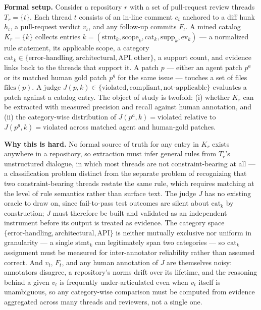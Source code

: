 \documentclass[11pt]{article}
\begin{document}
\noindent\textbf{Formal setup.} Consider a repository $r$ with a set of pull-request review threads $T_r = \{t\}$. Each thread $t$ consists of an in-line comment $c_t$ anchored to a diff hunk $h_t$, a pull-request verdict $v_t$, and any follow-up commits $F_t$. A mined catalog $K_r = \{k\}$ collects entries $k = (\text{stmt}_k, \text{scope}_k, \text{cat}_k, \text{supp}_k, \text{ev}_k)$ --- a normalized rule statement, its applicable scope, a category $\text{cat}_k \in \{\text{error-handling}, \text{architectural}, \text{API}, \text{other}\}$, a support count, and evidence links back to the threads that support it. A patch $p$ --- either an agent patch $p^a$ or its matched human gold patch $p^g$ for the same issue --- touches a set of files $\text{files}(p)$. A judge $J(p, k) \in \{\text{violated}, \text{compliant}, \text{not-applicable}\}$ evaluates a patch against a catalog entry. The object of study is twofold: (i) whether $K_r$ can be extracted with measured precision and recall against human annotation, and (ii) the category-wise distribution of $J(p^a, k) = \text{violated}$ relative to $J(p^g, k) = \text{violated}$ across matched agent and human-gold patches.

\noindent\textbf{Why this is hard.} No formal source of truth for any entry in $K_r$ exists anywhere in a repository, so extraction must infer general rules from $T_r$'s unstructured dialogue, in which most threads are not constraint-bearing at all --- a classification problem distinct from the separate problem of recognizing that two constraint-bearing threads restate the same rule, which requires matching at the level of rule semantics rather than surface text. The judge $J$ has no existing oracle to draw on, since fail-to-pass test outcomes are silent about $\text{cat}_k$ by construction; $J$ must therefore be built and validated as an independent instrument before its output is treated as evidence. The category space $\{\text{error-handling}, \text{architectural}, \text{API}\}$ is neither mutually exclusive nor uniform in granularity --- a single $\text{stmt}_k$ can legitimately span two categories --- so $\text{cat}_k$ assignment must be measured for inter-annotator reliability rather than assumed correct. And $v_t$, $F_t$, and any human annotation of $J$ are themselves noisy: annotators disagree, a repository's norms drift over its lifetime, and the reasoning behind a given $v_t$ is frequently under-articulated even when $v_t$ itself is unambiguous, so any category-wise comparison must be computed from evidence aggregated across many threads and reviewers, not a single one.
\end{document}
